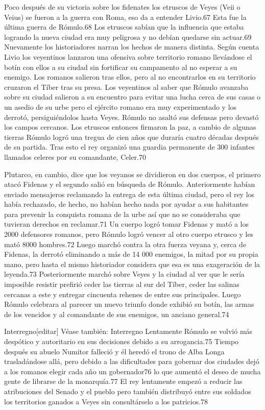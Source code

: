 \documentclass[11pt,a4paper]{book}
\begin{document}
	\bigskip
							Poco después de su victoria sobre los fidenates los etruscos de Veyes (Veii o Veius) se fueron a la guerra con Roma, eso da a entender Livio.67 Esta fue la última guerra de Rómulo.68 Los etruscos sabían que la influencia que estaba logrando la nueva ciudad era muy peligrosa y no debían quedarse sin actuar.69 Nuevamente los historiadores narran los hechos de manera distinta. Según cuenta Livio los veyentinos lanzaron una ofensiva sobre territorio romano llevándose el botín con ellos a su ciudad sin fortificar su campamento al no esperar a su enemigo. Los romanos salieron tras ellos, pero al no encontrarlos en su territorio cruzaron el Tíber tras su presa. Los veyentinos al saber que Rómulo avanzaba sobre su ciudad salieron a su encuentro para evitar una lucha cerca de sus casas o un asedio de su urbe pero el ejército romano era muy experimentado y los derrotó, persiguiéndolos hasta Veyes. Rómulo no asaltó sus defensas pero devastó los campos cercanos. Los etruscos entonces firmaron la paz, a cambio de algunas tierras Rómulo logró una tregua de cien años que duraría cuatro décadas después de su partida. Tras esto el rey organizó una guardia permanente de 300 infantes llamados celeres por su comandante, Celer.70
	\bigskip
							
	\bigskip
							Plutarco, en cambio, dice que los veyanos se dividieron en dos cuerpos, el primero atacó Fidenas y el segundo salió en búsqueda de Rómulo. Anteriormente habían enviado mensajeros reclamando la entrega de esta última ciudad, pero el rey los había rechazado, de hecho, no habían hecho nada por ayudar a sus habitantes para prevenir la conquista romana de la urbe así que no se consideraba que tuvieran derechos en reclamar.71 Un cuerpo logró tomar Fidenas y mató a los 2000 defensores romanos, pero Rómulo logró vencer al otro cuerpo etrusco y les mató 8000 hombres.72 Luego marchó contra la otra fuerza veyana y, cerca de Fidenas, la derrotó eliminando a más de 14 000 enemigos, la mitad por su propia mano, pero hasta el mismo historiador considera que esa es una exageración de la leyenda.73 Posteriormente marchó sobre Veyes y la ciudad al ver que le sería imposible resistir prefirió ceder las tierras al sur del Tíber, ceder las salinas cercanas a este y entregar cincuenta rehenes de entre sus principales. Luego Rómulo celebrara al parecer un nuevo triunfo donde exhibió su botín, las armas de los vencidos y al comandante de sus enemigos, un anciano general.74
	\bigskip
							
	\bigskip
							Interregno[editar]
	\bigskip
							Véase también: Interregno
	\bigskip
							Lentamente Rómulo se volvió más despótico y autoritario en sus decisiones debido a su arrogancia.75 Tiempo después su abuelo Numitor falleció y él heredó el trono de Alba Longa trasladándose allá, pero debido a las dificultades para gobernar dos ciudades dejó a los romanos elegir cada año un gobernador76 lo que aumentó el deseo de mucha gente de librarse de la monarquía.77 El rey lentamente empezó a reducir las atribuciones del Senado y el pueblo pero también distribuyó entre sus soldados los territorios ganados a Veyes sin consultárselo a los patricios.78
	\bigskip
							
\end{document}
